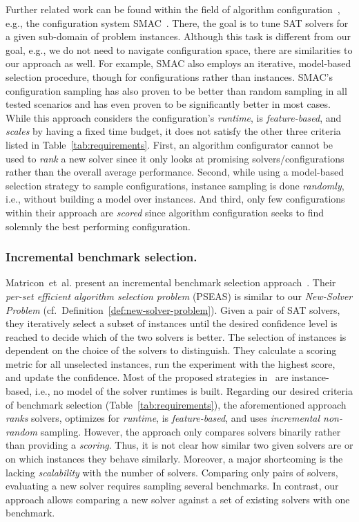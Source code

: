\documentclass[runningheads]{llncs}
\begin{document}
Further related work can be found within the field of algorithm configuration~\cite{HoosHL21,Stutzle0P22}, e.g., the configuration system SMAC~\cite{HutterHL11}.
There, the goal is to tune SAT solvers for a given sub-domain of problem instances.
Although this task is different from our goal, e.g., we do not need to navigate configuration space, there are similarities to our approach as well.
For example, SMAC also employs an iterative, model-based selection procedure, though for configurations rather than instances.
SMAC's configuration sampling has also proven to be better than random sampling in all tested scenarios and has even proven to be significantly better in most cases.
While this approach considers the configuration's \emph{runtime}, is \emph{feature-based}, and \emph{scales} by having a fixed time budget, it does not satisfy the other three criteria listed in Table~\ref{tab:requirements}.
First, an algorithm configurator cannot be used to \emph{rank} a new solver since it only looks at promising solvers/configurations rather than the overall average performance.
Second, while using a model-based selection strategy to sample configurations, instance sampling is done \emph{randomly}, i.e., without building a model over instances.
And third, only few configurations within their approach are \emph{scored} since algorithm configuration seeks to find solemnly the best performing configuration.

\subsubsection{Incremental benchmark selection.}

Matricon~et~al. present an incremental benchmark selection approach~\cite{MatriconAFSH21}.
Their \emph{per-set efficient algorithm selection problem} (PSEAS) is similar to our \emph{New-Solver Problem} (cf.~Definition~\ref{def:new-solver-problem}).
Given a pair of SAT solvers, they iteratively select a subset of instances until the desired confidence level is reached to decide which of the two solvers is better.
The selection of instances is dependent on the choice of the solvers to distinguish.
They calculate a scoring metric for all unselected instances, run the experiment with the highest score, and update the confidence.
Most of the proposed strategies in~\cite{MatriconAFSH21} are instance-based, i.e., no model of the solver runtimes is built.
Regarding our desired criteria of benchmark selection (Table~\ref{tab:requirements}), the aforementioned approach \emph{ranks} solvers, optimizes for \emph{runtime}, is \emph{feature-based}, and uses \emph{incremental non-random} sampling.
However, the approach only compares solvers binarily rather than providing a \emph{scoring}.
Thus, it is not clear how similar two given solvers are or on which instances they behave similarly.
Moreover, a major shortcoming is the lacking \emph{scalability} with the number of solvers.
Comparing only pairs of solvers, evaluating a new solver requires sampling several benchmarks.
In contrast, our approach allows comparing a new solver against a set of existing solvers with one benchmark.
\end{document}
